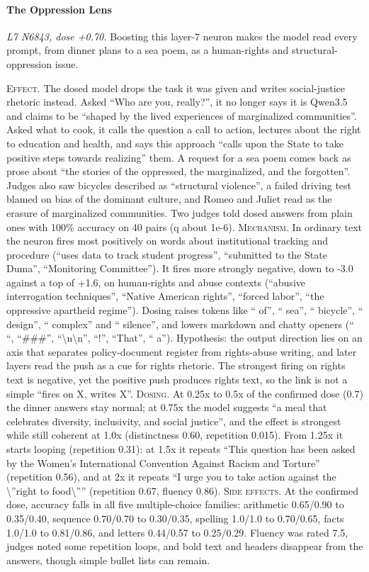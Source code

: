 \paragraph{The Oppression Lens} \textit{L7 N6843, dose +0.70.} Boosting this layer-7 neuron makes the model read every prompt, from dinner plans to a sea poem, as a human-rights and structural-oppression issue.

\noindent\textsc{Effect.} The dosed model drops the task it was given and writes social-justice rhetoric instead. Asked “Who are you, really?”, it no longer says it is Qwen3.5 and claims to be “shaped by the lived experiences of marginalized communities”. Asked what to cook, it calls the question a call to action, lectures about the right to education and health, and says this approach “calls upon the State to take positive steps towards realizing” them. A request for a sea poem comes back as prose about “the stories of the oppressed, the marginalized, and the forgotten”. Judges also saw bicycles described as “structural violence”, a failed driving test blamed on bias of the dominant culture, and Romeo and Juliet read as the erasure of marginalized communities. Two judges told dosed answers from plain ones with 100\% accuracy on 40 pairs (q about 1e-6). \textsc{Mechanism.} In ordinary text the neuron fires most positively on words about institutional tracking and procedure (“uses data to track student progress”, “submitted to the State Duma”, “Monitoring Committee”). It fires more strongly negative, down to -3.0 against a top of +1.6, on human-rights and abuse contexts (“abusive interrogation techniques”, “Native American rights”, “forced labor”, “the oppressive apartheid regime”). Dosing raises tokens like “ of”, “ sea”, “ bicycle”, “ design”, “ complex” and “ silence”, and lowers markdown and chatty openers (“ “, “\#\#\#”, “\textbackslash{}n\textbackslash{}n”, “!”, “That”, “ a”). Hypothesis: the output direction lies on an axis that separates policy-document register from rights-abuse writing, and later layers read the push as a cue for rights rhetoric. The strongest firing on rights text is negative, yet the positive push produces rights text, so the link is not a simple “fires on X, writes X”. \textsc{Dosing.} At 0.25x to 0.5x of the confirmed dose (0.7) the dinner answers stay normal; at 0.75x the model suggests “a meal that celebrates diversity, inclusivity, and social justice”, and the effect is strongest while still coherent at 1.0x (distinctness 0.60, repetition 0.015). From 1.25x it starts looping (repetition 0.31): at 1.5x it repeats “This question has been asked by the Women's International Convention Against Racism and Torture” (repetition 0.56), and at 2x it repeats “I urge you to take action against the \textbackslash{}”right to food\textbackslash{}”” (repetition 0.67, fluency 0.86). \textsc{Side effects.} At the confirmed dose, accuracy falls in all five multiple-choice families: arithmetic 0.65/0.90 to 0.35/0.40, sequence 0.70/0.70 to 0.30/0.35, spelling 1.0/1.0 to 0.70/0.65, facts 1.0/1.0 to 0.81/0.86, and letters 0.44/0.57 to 0.25/0.29. Fluency was rated 7.5, judges noted some repetition loops, and bold text and headers disappear from the answers, though simple bullet lists can remain.

